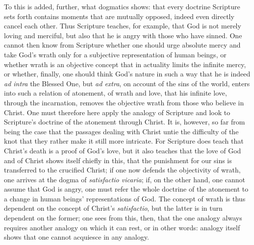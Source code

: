 \documentclass[12pt]{book}
\newcommand{\opage}[1]{\marginnote{\footnotesize\textit{[#1]}}}
\begin{document}
To this is added, further, what dogmatics shows: that every doctrine Scripture
sets forth contains moments that are mutually opposed, indeed even directly
cancel each other. Thus Scripture teaches, for example, that God is not
\opage{112} merely loving and merciful, but also that he is angry with those who
have sinned. One cannot then know from Scripture whether one should urge
absolute mercy and take God's wrath only for a subjective representation of
human beings, or whether wrath is an objective concept that in actuality limits
the infinite mercy, or whether, finally, one should think God's nature in such
a way that he is indeed \textit{ad intra} the Blessed One, but \textit{ad
extra}, on account of the sins of the world, enters into such a relation of
atonement, of wrath and love, that his infinite love, through the incarnation,
removes the objective wrath from those who believe in Christ. One must
therefore here apply the analogy of Scripture and look to Scripture's doctrine
of the atonement through Christ. It is, however, so far from being the case
that the passages dealing with Christ untie the difficulty of the knot that
they rather make it still more intricate. For Scripture does teach that
Christ's death is a proof of God's love, but it also teaches that the love of
God and of Christ shows itself chiefly in this, that the punishment for our
sins is transferred to the crucified Christ; if one now defends the
objectivity of wrath, one arrives at the dogma of \textit{satisfactio
vicaria}; if, on the other hand, one cannot assume that God is angry, one must
refer the whole doctrine of the atonement to a change in human beings'
representations of God. The concept of wrath is thus dependent on the concept
of Christ's \textit{satisfactio}, but the latter is in turn dependent on the
former; one sees from this, then, that the one analogy always requires another
analogy on which it can rest, or in other words: analogy itself shows that one
cannot acquiesce in any analogy.
\end{document}
